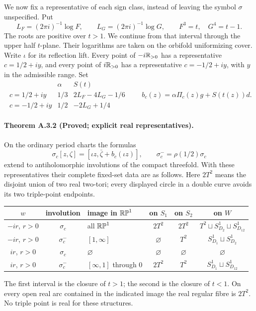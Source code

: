We now fix a representative of each sign class, instead of leaving the
symbol $\sigma$ unspecified. Put
\[
 L_F=(2\pi i)^{-1}\log F,\qquad L_G=(2\pi i)^{-1}\log G,
 \qquad F^3=t,\quad G^4=t-1.
 \tag{A.3.1}
\]
The roots are positive over $t>1$. We continue from that interval
through the upper half $t$-plane. Their logarithms are taken on the
orbifold uniformizing cover. Write $\iota$ for its reflection lift.
Every point of $-i\mathbb R_{>0}$ has a representative $c=1/2+iy$, and every
point of $i\mathbb R_{>0}$ has a representative $c=-1/2+iy$, with $y$ in the
admissible range. Set
\[
\begin{array}{c|c|c}
 &\alpha&S(t)\\\hline
 c=1/2+iy&1/3&2L_F-4L_G-1/6\\
 c=-1/2+iy&1/2&-2L_G+1/4
\end{array}
\qquad b_c(z)=\alpha\Pi_c(z)g+S(t(z))d.
\tag{A.3.2}
\]

\paragraph{Theorem A.3.2 (Proved; explicit real representatives).}
On the ordinary period charts the formulas
\[
 \sigma_c[z,\zeta]=[\iota z,\bar\zeta+b_c(\iota z)],
 \qquad \sigma_c^- =\rho(1/2)\sigma_c
 \tag{A.3.3}
\]
extend to antiholomorphic involutions of the compact threefold.
With these representatives their complete fixed-set data are as follows.
Here $2T^2$ means the disjoint union of two real two-tori; every displayed
circle in a double curve avoids its two triple-point endpoints.
\begin{center}\small
\begin{tabular}{cclccc}
\toprule
$w$&involution&image in $\mathbb{RP}^1$&on $S_1$&on $S_2$&on $W$\\
\midrule
$-ir$, $r>0$&$\sigma_c$&all $\mathbb{RP}^1$&$2T^2$&$2T^2$&$T^2\sqcup S^1_{D_2}\sqcup S^1_{D_{12}}$\\
$-ir$, $r>0$&$\sigma_c^-$&$[1,\infty]$&$\varnothing$&$T^2$&$S^1_{D_1}\sqcup S^1_{D_2}$\\
$ir$, $r>0$&$\sigma_c$&$\varnothing$&$\varnothing$&$\varnothing$&$\varnothing$\\
$ir$, $r>0$&$\sigma_c^-$&$[\infty,1]$ through $0$&$2T^2$&$T^2$&$S^1_{D_1}\sqcup S^1_{D_{12}}$\\
\bottomrule
\end{tabular}
\end{center}
The first interval is the closure of $t>1$; the second is the closure
of $t<1$. On every open real arc contained in the indicated image the
real regular fibre is $2T^2$. No triple point is real for these structures.

